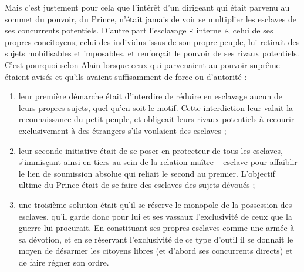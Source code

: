 Mais c'est justement pour cela que l'intérêt d'un dirigeant qui était
parvenu au sommet du pouvoir, du Prince, n'était jamais de voir se multiplier
les esclaves de ses concurrents potentiels. D'autre part l'esclavage «
interne », celui de ses propres concitoyens, celui des individus issus de
son propre peuple, lui retirait des sujets mobilisables et imposables, et
renforçait le pouvoir de ses rivaux potentiels. C'est pourquoi selon Alain
 lorsque ceux qui parvenaient au pouvoir suprême étaient avisés
et qu'ils avaient suffisamment de force ou d'autorité :
\begin{enumerate}
\item leur première
démarche était d'interdire de réduire en esclavage aucun de leurs
propres sujets, quel qu'en soit le motif. Cette interdiction leur valait la reconnaissance
du petit peuple, et obligeait leurs rivaux potentiels à recourir
exclusivement à des étrangers s'ils voulaient des esclaves ;
\item leur seconde
initiative était de se poser en protecteur de tous les esclaves, s'immisçant
ainsi en tiers au sein de la relation maître -- esclave pour affaiblir
le lien de soumission absolue qui reliait le second au premier. L'objectif
ultime du Prince était de se faire des esclaves des sujets dévoués ;
\item une
troisième solution était qu'il se réserve le monopole de la possession des
esclaves, qu'il garde donc pour lui et ses vassaux l'exclusivité de ceux que
la guerre lui procurait. En constituant ses propres esclaves comme une
armée à sa dévotion, et en se réservant l'exclusivité de ce type d'outil il se
donnait le moyen de désarmer les citoyens libres (et d'abord ses concurrents
directs) et de faire régner son ordre.
\end{enumerate}

